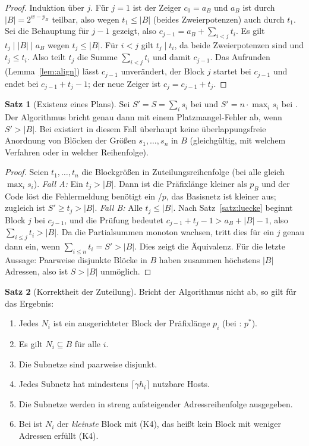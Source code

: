 \documentclass[a4paper,12pt, twoside]{report}
\theoremstyle{definition}
\newtheorem{satz}{Satz}
\newcommand{\code}[1]{\texttt{\detokenize{#1}}}
\begin{document}
\begin{proof}
	Induktion über $j$. Für $j=1$ ist der Zeiger $c_0 = a_B$ und $a_B$ ist durch $|B| = 2^{w-p_B}$ teilbar, also wegen $t_1 \le |B|$ (beides Zweierpotenzen) auch durch $t_1$. Sei die Behauptung für $j-1$ gezeigt, also $c_{j-1} = a_B + \sum_{i<j} t_i$. Es gilt $t_j \mid |B| \mid a_B$ wegen $t_j \le |B|$. Für $i < j$ gilt $t_j \mid t_i$, da beide Zweierpotenzen sind und $t_j \le t_i$. Also teilt $t_j$ die Summe $\sum_{i<j}t_i$ und damit $c_{j-1}$. Das Aufrunden (Lemma~\ref{lem:align}) lässt $c_{j-1}$ unverändert, der Block $j$ startet bei $c_{j-1}$ und endet bei $c_{j-1}+t_j - 1$; der neue Zeiger ist $c_j = c_{j-1} + t_j$.
\end{proof}

\begin{satz}[Existenz eines Plans]
\label{satz:existenz}
	Sei $S' = S = \sum_i s_i$ bei \code{vlsm} und $S' = n\cdot \max_i s_i$ bei \code{fixed}. Der Algorithmus bricht genau dann mit einem Platzmangel-Fehler ab, wenn $S' > |B|$. Bei \code{vlsm} existiert in diesem Fall überhaupt keine überlappungsfreie Anordnung von Blöcken der Größen $s_1,\ldots,s_n$ in $B$ (gleichgültig, mit welchem Verfahren oder in welcher Reihenfolge).
\end{satz}

\begin{proof}
	Seien $t_1,\ldots,t_n$ die Blockgrößen in Zuteilungsreihenfolge (bei \code{fixed} alle gleich $\max_i s_i$). \emph{Fall A:} Ein $t_j > |B|$. Dann ist die Präfixlänge kleiner als $p_B$ und der Code löst die Fehlermeldung \glqq benötigt ein /$p$, das Basisnetz ist kleiner\grqq{} aus; zugleich ist $S' \ge t_j > |B|$. \emph{Fall B:} Alle $t_j \le |B|$. Nach Satz~\ref{satz:luecke} beginnt Block $j$ bei $c_{j-1}$, und die Prüfung \code{start + size - 1 > end} bedeutet $c_{j-1} + t_j - 1 > a_B + |B| - 1$, also $\sum_{i\le j} t_i > |B|$. Da die Partialsummen monoton wachsen, tritt dies für ein $j$ genau dann ein, wenn $\sum_{i\le n} t_i = S' > |B|$. Dies zeigt die Äquivalenz. Für die letzte Aussage: Paarweise disjunkte Blöcke in $B$ haben zusammen höchstens $|B|$ Adressen, also ist $S > |B|$ unmöglich.
\end{proof}

\begin{satz}[Korrektheit der Zuteilung]
\label{satz:korrekt}
	Bricht der Algorithmus nicht ab, so gilt für das Ergebnis:
	\begin{enumerate}[label=(K\arabic*)]
		\item Jedes $N_i$ ist ein ausgerichteter Block der Präfixlänge $p_i$ (bei \code{fixed}: $p^*$).
		\item Es gilt $N_i \subseteq B$ für alle $i$.
		\item Die Subnetze sind paarweise disjunkt.
		\item Jedes Subnetz hat mindestens $\lceil \gamma h_i \rceil$ nutzbare Hosts.
		\item Die Subnetze werden in streng aufsteigender Adressreihenfolge ausgegeben.
		\item Bei \code{vlsm} ist $N_i$ der \emph{kleinste} Block mit (K4), das heißt kein Block mit weniger Adressen erfüllt (K4).
	\end{enumerate}
\end{satz}
\end{document}
